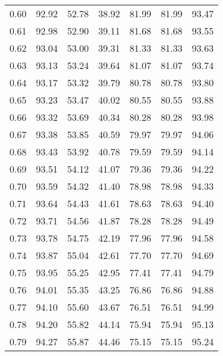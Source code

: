 \begin{tabular}{|c|c|c|c|c|c|c|}
      0.60 &     92.92 &     52.78 &      38.92 &   81.99 &      81.99 &         93.47 \\
      0.61 &     92.98 &     52.90 &      39.11 &   81.68 &      81.68 &         93.55 \\
      0.62 &     93.04 &     53.00 &      39.31 &   81.33 &      81.33 &         93.63 \\
      0.63 &     93.13 &     53.24 &      39.64 &   81.07 &      81.07 &         93.74 \\
      0.64 &     93.17 &     53.32 &      39.79 &   80.78 &      80.78 &         93.80 \\
      0.65 &     93.23 &     53.47 &      40.02 &   80.55 &      80.55 &         93.88 \\
      0.66 &     93.32 &     53.69 &      40.34 &   80.28 &      80.28 &         93.98 \\
      0.67 &     93.38 &     53.85 &      40.59 &   79.97 &      79.97 &         94.06 \\
      0.68 &     93.43 &     53.92 &      40.78 &   79.59 &      79.59 &         94.14 \\
      0.69 &     93.51 &     54.12 &      41.07 &   79.36 &      79.36 &         94.22 \\
      0.70 &     93.59 &     54.32 &      41.40 &   78.98 &      78.98 &         94.33 \\
      0.71 &     93.64 &     54.43 &      41.61 &   78.63 &      78.63 &         94.40 \\
      0.72 &     93.71 &     54.56 &      41.87 &   78.28 &      78.28 &         94.49 \\
      0.73 &     93.78 &     54.75 &      42.19 &   77.96 &      77.96 &         94.58 \\
      0.74 &     93.87 &     55.04 &      42.61 &   77.70 &      77.70 &         94.69 \\
      0.75 &     93.95 &     55.25 &      42.95 &   77.41 &      77.41 &         94.79 \\
      0.76 &     94.01 &     55.35 &      43.25 &   76.86 &      76.86 &         94.88 \\
      0.77 &     94.10 &     55.60 &      43.67 &   76.51 &      76.51 &         94.99 \\
      0.78 &     94.20 &     55.82 &      44.14 &   75.94 &      75.94 &         95.13 \\
      0.79 &     94.27 &     55.87 &      44.46 &   75.15 &      75.15 &         95.24 \\

\end{tabular}
